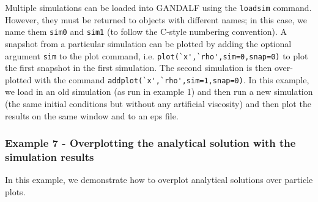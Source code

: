 \documentclass[a4paper]{article}
\newcommand{\var}[1]{\texttt{#1}}
\begin{document}






\noindent Multiple simulations can be loaded into GANDALF using the \var{loadsim} command.  However, they must be returned to objects with different names; in this case, we name them \var{sim0} and \var{sim1} (to follow the C-style numbering convention).  A snapshot from a particular simulation can be plotted by adding the optional argument \var{sim} to the plot command, i.e. \lstinline{plot(`x',`rho',sim=0,snap=0)} to plot the first snapshot in the first simulation.  The second simulation is then over-plotted with the command \lstinline{addplot(`x',`rho',sim=1,snap=0)}.  In this example, we load in an old simulation (as run in example 1) and then run a new simulation (the same initial conditions but without any artificial viscosity) and then plot the results on the same window and to an eps file.


\subsubsection{Example  7 - Overplotting the analytical solution with the simulation results}
In this example, we demonstrate how to overplot analytical solutions over particle plots. \\

\end{document}

